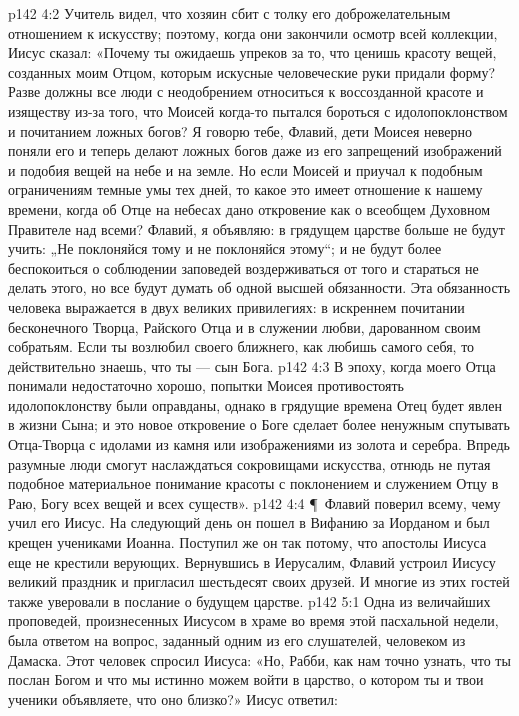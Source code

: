 \vs p142 4:2 Учитель видел, что хозяин сбит с толку его доброжелательным отношением к искусству; поэтому, когда они закончили осмотр всей коллекции, Иисус сказал: «Почему ты ожидаешь упреков за то, что ценишь красоту вещей, созданных моим Отцом, которым искусные человеческие руки придали форму? Разве должны все люди с неодобрением относиться к воссозданной красоте и изяществу из\hyp{}за того, что Моисей когда\hyp{}то пытался бороться с идолопоклонством и почитанием ложных богов? Я говорю тебе, Флавий, дети Моисея неверно поняли его и теперь делают ложных богов даже из его запрещений изображений и подобия вещей на небе и на земле. Но если Моисей и приучал к подобным ограничениям темные умы тех дней, то какое это имеет отношение к нашему времени, когда об Отце на небесах дано откровение как о всеобщем Духовном Правителе над всеми? Флавий, я объявляю: в грядущем царстве больше не будут учить: „Не поклоняйся тому и не поклоняйся этому“; и не будут более беспокоиться о соблюдении заповедей воздерживаться от того и стараться не делать этого, но все будут думать об одной высшей обязанности. Эта обязанность человека выражается в двух великих привилегиях: в искреннем почитании бесконечного Творца, Райского Отца и в служении любви, дарованном своим собратьям. Если ты возлюбил своего ближнего, как любишь самого себя, то действительно знаешь, что ты --- сын Бога.
\vs p142 4:3 В эпоху, когда моего Отца понимали недостаточно хорошо, попытки Моисея противостоять идолопоклонству были оправданы, однако в грядущие времена Отец будет явлен в жизни Сына; и это новое откровение о Боге сделает более ненужным спутывать Отца\hyp{}Творца с идолами из камня или изображениями из золота и серебра. Впредь разумные люди смогут наслаждаться сокровищами искусства, отнюдь не путая подобное материальное понимание красоты с поклонением и служением Отцу в Раю, Богу всех вещей и всех существ».
\vs p142 4:4 \P\ Флавий поверил всему, чему учил его Иисус. На следующий день он пошел в Вифанию за Иорданом и был крещен учениками Иоанна. Поступил же он так потому, что апостолы Иисуса еще не крестили верующих. Вернувшись в Иерусалим, Флавий устроил Иисусу великий праздник и пригласил шестьдесят своих друзей. И многие из этих гостей также уверовали в послание о будущем царстве.
\vs p142 5:1 Одна из величайших проповедей, произнесенных Иисусом в храме во время этой пасхальной недели, была ответом на вопрос, заданный одним из его слушателей, человеком из Дамаска. Этот человек спросил Иисуса: «Но, Рабби, как нам точно узнать, что ты послан Богом и что мы истинно можем войти в царство, о котором ты и твои ученики объявляете, что оно близко?» Иисус ответил:
